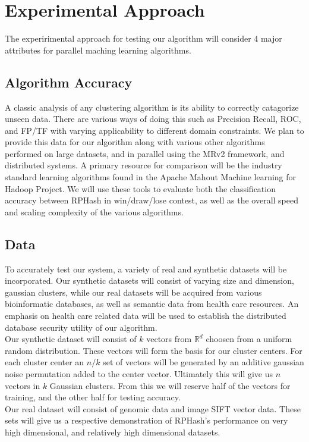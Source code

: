 \documentclass[a4paper,10pt]{article}
\begin{document}
\section{Experimental Approach}


The experirimental approach for testing our algorithm will consider 4 major attributes for 
parallel maching learning algorithms.

\subsection{Algorithm Accuracy}
A classic analysis of any clustering algorithm is its ability to correctly catagorize unseen data. There are various ways
of doing this such as Precision Recall, ROC, and FP/TF with varying applicability to different domain constraints. We
plan to provide this data for our algorithm along with various other algorithms performed on large datasets, and in 
parallel using the MRv2 framework, and distributed systems. A primary resource for comparison will be the industry 
standard learning algorithms found in the Apache Mahout Machine learning for Hadoop Project. We will use these
tools to evaluate both the classification accuracy between RPHash in win/draw/lose contest, as well as the overall
speed and scaling complexity of the various algorithms.

\subsection{Data}
To accurately test our system, a variety of real and synthetic datasets will be incorporated. Our synthetic datasets will
consist of varying size and dimension, gaussian clusters, while our real datasets will be acquired from various bioinformatic
databases, as well as semantic data from health care resources. An emphasis on health care related data will
be used to establish the distributed database security utility of our algorithm. \\
Our synthetic dataset will consist of $k$ vectors from $\mathbb{R}^d$ choosen from a uniform random distribution.
These vectors will form the basis for our cluster centers. For each cluster center an $n/k$ set of vectors
will be generated by an additive gaussian noise permutation added to the center vector. Ultimately
this will give us $n$ vectors in $k$ Gaussian clusters. From this we will reserve half of the vectors for
training, and the other half for testing accuracy.\\
Our real dataset will consist of genomic data and image SIFT vector data. These sets will give us
a respective demonstration of RPHash's performance on very high dimensional, and relatively high dimensional 
datasets.
\end{document}
